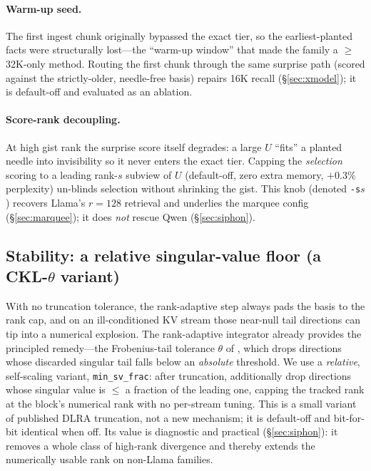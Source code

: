 \documentclass[11pt]{article}
\begin{document}
\paragraph{Warm-up seed.} The first ingest chunk originally bypassed the exact
tier, so the earliest-planted facts were structurally lost---the ``warm-up
window'' that made the family a $\ge$32K-only method. Routing the first chunk
through the same surprise path (scored against the strictly-older, needle-free
basis) repairs 16K recall (\S\ref{sec:xmodel}); it is default-off and evaluated
as an ablation.

\paragraph{Score-rank decoupling.} At high gist rank the surprise score itself
degrades: a large $U$ ``fits'' a planted needle into invisibility so it never
enters the exact tier. Capping the \emph{selection} scoring to a leading
rank-$s$ subview of $U$ (default-off, zero extra memory, $+0.3\%$ perplexity)
un-blinds selection without shrinking the gist. This knob (denoted \texttt{-s}$s$)
recovers Llama's $r{=}128$ retrieval and underlies the marquee config
(\S\ref{sec:marquee}); it does \emph{not} rescue Qwen (\S\ref{sec:siphon}).

\subsection{Stability: a relative singular-value floor (a CKL-$\theta$ variant)}
\label{sec:floor}
With no truncation tolerance, the rank-adaptive step always pads the basis to the
rank cap, and on an ill-conditioned KV stream those near-null tail directions can
tip into a numerical explosion. The rank-adaptive integrator already provides the
principled remedy---the Frobenius-tail tolerance $\theta$ of
\citet{ceruti2022rankadaptive}, which drops directions whose discarded singular
tail falls below an \emph{absolute} threshold. We use a \emph{relative},
self-scaling variant, \texttt{min\_sv\_frac}: after truncation, additionally drop
directions whose singular value is $\le$ a fraction of the leading one, capping
the tracked rank at the block's numerical rank with no per-stream tuning. This is
a small variant of published DLRA truncation, not a new mechanism; it is
default-off and bit-for-bit identical when off. Its value is diagnostic and
practical (\S\ref{sec:siphon}): it removes a whole class of high-rank divergence
and thereby extends the numerically usable rank on non-Llama families.
\end{document}
